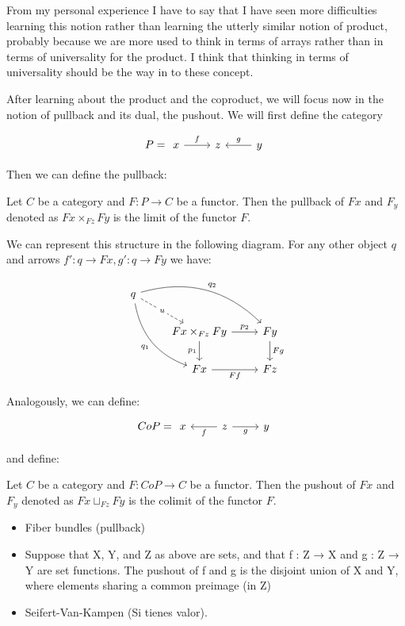 From my personal experience I have to say that I have seen more difficulties learning this notion rather than learning the utterly similar notion of product, probably because we are more used to think in terms of arrays rather than in terms of universality for the product. I think that thinking in terms of universality should be the way in to these concept.


After learning about the product and the coproduct, we will focus now in the notion of pullback and its dual, the pushout. We will first define the category

\[
  P = \begin{tikzcd}
    x\arrow{r}{f} & z & y\arrow[swap]{l}{g}
\end{tikzcd}
\]

Then we can define the pullback:

\begin{definition}
  Let $C$ be a category and $F:P\to C$ be a functor. Then the pullback of $Fx$ and $F_y$ denoted as $Fx\times_{Fz}Fy$ is the limit of the functor $F$.
\end{definition}

We can represent this structure in the following diagram. For any other object $q$ and arrows $f':q\to Fx,g':q\to Fy$ we have:

\[
\begin{tikzcd}
q
\arrow[bend left]{drr}{q_2}
\arrow[bend right,swap]{ddr}{q_1}
\arrow[dashed]{dr}[description]{u} & & \\
& Fx\times_{Fz}Fy \arrow{r}{p_2} \arrow{d}[swap]{p_1}
& Fy \arrow{d}{Fg} \\
& Fx \arrow[swap]{r}{Ff}
& Fz
\end{tikzcd}
\]

Analogously, we can define:

\[
  CoP = \begin{tikzcd}
    x & z\arrow{l}{f}\arrow[swap]{r}{g} & y
\end{tikzcd}
\]

and define:
\begin{definition}
  Let $C$ be a category and $F:CoP\to C$ be a functor. Then the pushout of $Fx$ and $F_y$ denoted as $Fx\sqcup_{Fz}Fy$ is the colimit of the functor $F$.
\end{definition}

\begin{example}
  \begin{itemize}
  \item Fiber bundles (pullback)
  \item Suppose that X, Y, and Z as above are sets, and that f : Z → X and g : Z → Y are set functions. The pushout of f and g is the disjoint union of X and Y, where elements sharing a common preimage (in Z)
   \item Seifert-Van-Kampen (Si tienes valor).
  \end{itemize}
\end{example}

